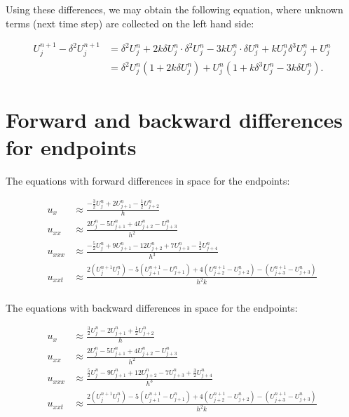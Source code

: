 \documentclass[fleqn]{article}
\begin{document}
Using these differences, we may obtain the following equation, where unknown terms (next time step) are collected on the left hand side:

\begin{align*}
U_j^{n+1} - \delta^2 U_j^{n+1} &= \delta^2 U_j^n + 2k\delta U_j^n \cdot \delta ^2U_j^n - 3 k U_j^n \cdot \delta U_j^n + k U_j^n \delta^3 U_j^n + U_j^n \\
&= \delta^2 U_j^n \left( 1 + 2k \delta U_j^n \right) + U_j^n \left(1 + k \delta^3 U_j^n - 3 k \delta U_j^n \right).
\end{align*}


\section*{Forward and backward differences for endpoints}
The equations with forward differences in space for the endpoints:

\begin{align*}
u_x &\approx \frac{-\frac{3}{2}U_j^n+2U_{j+1}^n-\frac{1}{2}U_{j+2}^n}{h} \\
u_{xx} &\approx \frac{2U_j^n-5U_{j+1}^n+4U_{j+2}^n-U_{j+3}^n}{h^{2}} \\
u_{xxx} &\approx \frac{-\frac{5}{2}U_j^n+9U_{j+1}^n-12U_{j+2}^n+7U_{j+3}^n-\frac{3}{2}U_{j+4}^n}{h^{3}} \\
u_{xxt} &\approx \frac{2\left(U_j^{n+1}U_j^n\right)-5\left(U_{j+1}^{n+1}-U_{j+1}^{n}\right)+4\left(U_{j+2}^{n+1}-U_{j+2}^n\right)-\left(U_{j+3}^{n+1}-U_{j+3}^n\right)}{h^{2}k} \\
\end{align*}

The equations with backward differences in space for the endpoints:

\begin{align*}
u_x &\approx \frac{\frac{3}{2}U_j^n-2U_{j+1}^n+\frac{1}{2}U_{j+2}^n}{h} \\
u_{xx} &\approx \frac{2U_j^n-5U_{j+1}^n+4U_{j+2}^n-U_{j+3}^n}{h^{2}} \\
u_{xxx} &\approx \frac{\frac{5}{2}U_j^n-9U_{j+1}^n+12U_{j+2}^n-7U_{j+3}^n+\frac{3}{2}U_{j+4}^n}{h^{3}} \\
u_{xxt} &\approx \frac{2\left(U_j^{n+1}U_j^n\right)-5\left(U_{j+1}^{n+1}-U_{j+1}^{n}\right)+4\left(U_{j+2}^{n+1}-U_{j+2}^n\right)-\left(U_{j+3}^{n+1}-U_{j+3}^n\right)}{h^{2}k} \\
\end{align*}
\end{document}
